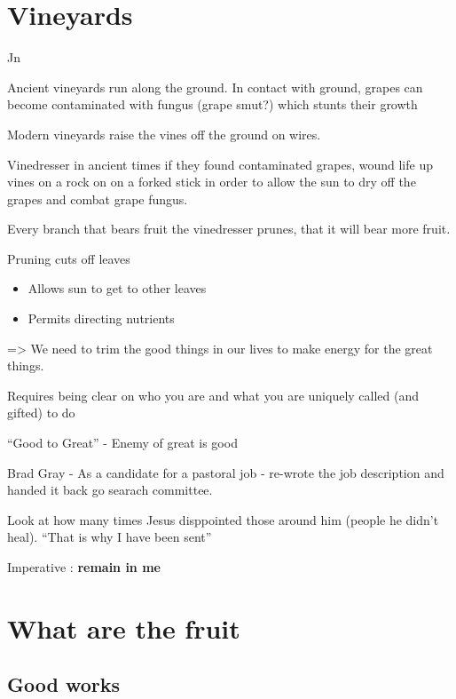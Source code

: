 \documentclass[
]{book}
\providecommand{\tightlist}{%
  \setlength{\itemsep}{0pt}\setlength{\parskip}{0pt}}
\begin{document}
\hypertarget{vineyards}{%
\section{Vineyards}\label{vineyards}}

Jn

Ancient vineyards run along the ground. In contact with ground, grapes can become contaminated with fungus (grape smut?) which stunts their growth

Modern vineyards raise the vines off the ground on wires.

Vinedresser in ancient times if they found contaminated grapes, wound life up vines on a rock on on a forked stick in order to allow the sun to dry off the grapes and combat grape fungus.

Every branch that bears fruit the vinedresser prunes, that it will bear more fruit.

Pruning cuts off leaves

\begin{itemize}
\tightlist
\item
  Allows sun to get to other leaves
\item
  Permits directing nutrients
\end{itemize}

=\textgreater{} We need to trim the good things in our lives to make energy for the great things.

Requires being clear on who you are and what you are uniquely called (and gifted) to do

``Good to Great'' - Enemy of great is good

Brad Gray - As a candidate for a pastoral job - re-wrote the job description and handed it back go searach committee.

Look at how many times Jesus disppointed those around him (people he didn't heal). ``That is why I have been sent''

Imperative : \textbf{remain in me}

\hypertarget{what-are-the-fruit}{%
\section{What are the fruit}\label{what-are-the-fruit}}

\hypertarget{good-works}{%
\subsection{Good works}\label{good-works}}
\end{document}
